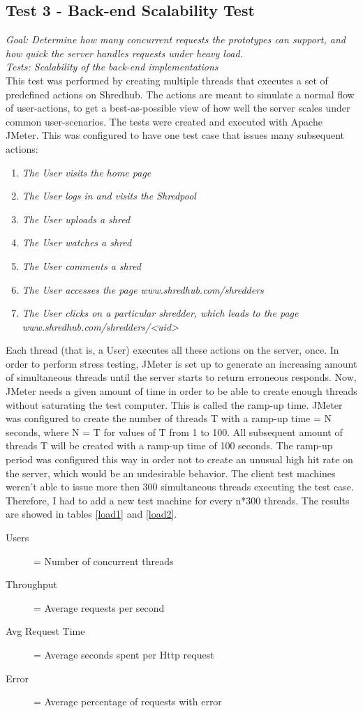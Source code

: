 \subsection{Test 3 - Back-end Scalability Test}
\textit{Goal: Determine how many concurrent requests the prototypes can support, and how quick the server handles requests under heavy load.} \\
\textit{Tests: Scalability of the back-end implementations}\\
This test was performed by creating multiple threads that executes a set of predefined actions on Shredhub. The actions are meant to simulate a normal flow of user-actions, to get a best-as-possible view of how well the server scales under common user-scenarios. The tests were created and executed with Apache JMeter. This was configured to have one test case that issues many subsequent actions: 

\begin{enumerate}
\item \textit{The User visits the home page}
\item \textit{The User logs in and visits the Shredpool}
\item \textit{The User uploads a shred}
\item \textit{The User watches a shred}
\item \textit{The User comments a shred}
\item \textit{The User accesses the page www.shredhub.com/shredders}
\item \textit{The User clicks on a particular shredder, which leads to the page www.shredhub.com/shredders/<uid>}
\end{enumerate}

Each thread (that is, a User) executes all these actions on the server, once. In order to perform stress testing,  JMeter is  set up to generate an increasing amount of simultaneous threads until the server starts to return erroneous responds. Now, JMeter needs a given amount of time in order to be able to create enough threads without saturating the test computer. This is called the ramp-up time. JMeter was configured to create the number of threads T with a ramp-up time = N seconds, where N = T for values of T from 1 to 100. All subsequent amount of threads T will be created with a ramp-up time of 100 seconds. The ramp-up period was configured this way in order not to create an unusual high hit rate on the server, which would be an undesirable behavior. The client test machines weren't able to issue more then 300 simultaneous threads executing the test case. Therefore, I had to add a new test machine for every n*300 threads. The results are showed in tables \vref{load1} and \vref{load2}.
\begin{description}
  \item[Users] = Number of concurrent threads
  \item[Throughput] = Average requests per second
  \item[Avg Request Time] = Average seconds spent per Http request
  \item[Error] = Average percentage of requests with error
\end{description}

